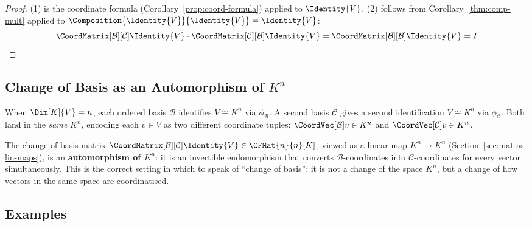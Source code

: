 \begin{proof}
    (1) is the coordinate formula (Corollary~\ref{prop:coord-formula}) applied to
    $\Identity{V}$.
    (2) follows from Corollary~\ref{thm:comp-mult} applied to
    $\Composition{\Identity{V}}{\Identity{V}} = \Identity{V}$:
    \[
        \CoordMatrix[\mathcal{B}][\mathcal{C}]{\Identity{V}}
        \cdot \CoordMatrix[\mathcal{C}][\mathcal{B}]{\Identity{V}}
        = \CoordMatrix[\mathcal{B}][\mathcal{B}]{\Identity{V}}
        = I \qedhere
    \]
\end{proof}

\subsection{Change of Basis as an Automorphism of $K^n$}

\begin{remark}
\label{rem:cob-automorphism}
    When $\Dim[K]{V} = n$, each ordered basis $\mathcal{B}$ identifies $V \cong K^n$ via
    $\phi_{\mathcal{B}}$. A second basis $\mathcal{C}$ gives a second identification
    $V \cong K^n$ via $\phi_{\mathcal{C}}$. Both land in the \emph{same} $K^n$, encoding each
    $v \in V$ as two different coordinate tuples:
    $\CoordVec[\mathcal{B}]{v} \in K^n$ and $\CoordVec[\mathcal{C}]{v} \in K^n$.

    The change of basis matrix
    $\CoordMatrix[\mathcal{B}][\mathcal{C}]{\Identity{V}} \in \CFMat{n}{n}[K]$,
    viewed as a linear map $K^n \to K^n$ (Section~\ref{sec:mat-as-lin-maps}), is an
    \textbf{automorphism of $K^n$}: it is an invertible endomorphism that converts
    $\mathcal{B}$-coordinates into $\mathcal{C}$-coordinates for every vector simultaneously.
    This is the correct setting in which to speak of ``change of basis'': it is not a change
    of the space $K^n$, but a change of how vectors in the same space are coordinatised.
\end{remark}

\subsection{Examples}

